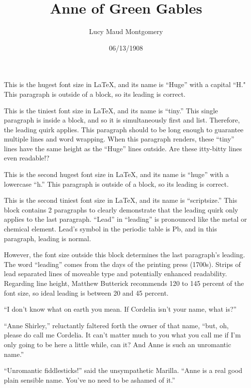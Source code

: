 \documentclass[a4paper]{article}
\title{Anne of Green Gables}
\author{Lucy Maud Montgomery}
\date{06/13/1908}
\begin{document}
\maketitle

\Huge This is the hugest font size in \LaTeX, and its name is ``Huge'' with a capital ``H." This paragraph is outside of a block, so its leading is correct.

{\tiny This is the tiniest font size in \LaTeX, and its name is ``tiny.'' This single paragraph is inside a block, and so it is simultaneously first and list. Therefore, the leading quirk applies. This paragraph should to be long enough to guarantee multiple lines and word wrapping. When this paragraph renders, these ``tiny'' lines have the same height as the ``Huge'' lines outside. Are these itty-bitty lines even readable!?}

\huge This is the second hugest font size in \LaTeX, and its name is ``huge'' with a lowercase ``h.'' This paragraph is outside of a block, so its leading is correct.

{\scriptsize This is the second tiniest font size in \LaTeX, and its name is ``scriptsize.'' This block contains 2 paragraphs to clearly demonstrate that the leading quirk only applies to the last paragraph. ``Lead'' in ``leading'' is pronounced like the metal or chemical element. Lead's symbol in the periodic table is Pb, and in this paragraph, leading is normal.

However, the font size outside this block determines the last paragraph's leading. The word ``leading'' comes from the days of the printing press (1700s). Strips of lead separated lines of moveable type and potentially enhanced readability. Regarding line height, Matthew Butterick recommends 120 to 145 percent of the font size, so ideal leading is between 20 and 45 percent.}

\Huge ``I don't know what on earth you mean. If Cordelia isn't your name, what is?''

{\tiny ``Anne Shirley,'' reluctantly faltered forth the owner of that name, ``but, oh, please do call me Cordelia. It can't matter much to you what you call me if I'm only going to be here a little while, can it? And Anne is such an unromantic name.''}

\huge ``Unromantic fiddlesticks!'' said the unsympathetic Marilla. ``Anne is a real good plain sensible name. You've no need to be ashamed of it.''
\end{document}
